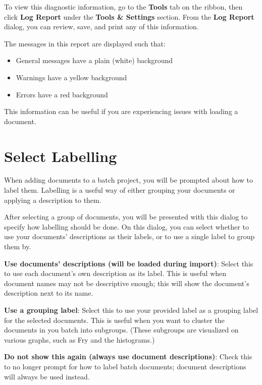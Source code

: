 \documentclass[
]{book}
\providecommand{\tightlist}{%
  \setlength{\itemsep}{0pt}\setlength{\parskip}{0pt}}
\newenvironment{optionssection}
    {
    \begin{tcolorbox}[colframe=lightgray,colback=ultralightgray,sharp corners=all,parbox=false]
    }
    {
    \end{tcolorbox}
    }
\theoremstyle{definition}
\theoremstyle{definition}
\theoremstyle{definition}
\theoremstyle{definition}
\theoremstyle{remark}
\begin{document}
To view this diagnostic information, go to the \textbf{Tools} tab on the ribbon, then click \textbf{Log Report} under the \textbf{Tools \& Settings} section. From the \textbf{Log Report} dialog, you can review, save, and print any of this information.

The messages in this report are displayed such that:

\begin{itemize}
\tightlist
\item
  General messages have a plain (white) background
\item
  Warnings have a yellow background
\item
  Errors have a red background
\end{itemize}

This information can be useful if you are experiencing issues with loading a document.

\hypertarget{select-labelling}{%
\section{Select Labelling}\label{select-labelling}}

When adding documents to a batch project, you will be prompted about how to label them. Labelling is a useful way of either grouping your documents or applying a description to them.

After selecting a group of documents, you will be presented with this dialog to specify how labelling should be done. On this dialog, you can select whether to use your documents' descriptions as their labels, or to use a single label to group them by.

\begin{optionssection}
\textbf{Use documents' descriptions (will be loaded during import)}: Select this to use each document's own description as its label. This is useful when document names may not be descriptive enough; this will show the document's description next to its name.

\textbf{Use a grouping label}: Select this to use your provided label as a grouping label for the selected documents. This is useful when you want to cluster the documents in you batch into subgroups. (These subgroups are visualized on various graphs, such as Fry and the histograms.)

\end{optionssection}

\textbf{Do not show this again (always use document descriptions)}: Check this to no longer prompt for how to label batch documents; document descriptions will always be used instead.
\end{document}
